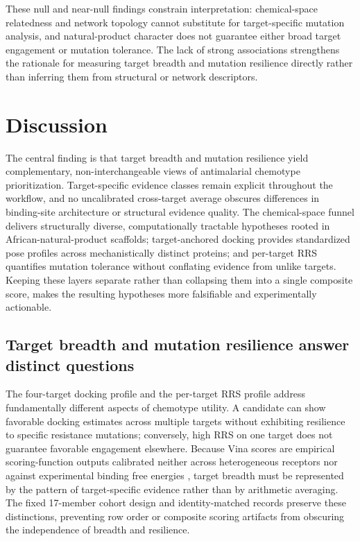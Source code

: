 \documentclass[journal=jcisd8,manuscript=article]{achemso}
\begin{document}
These null and near-null findings constrain interpretation: chemical-space relatedness and network topology cannot substitute for target-specific mutation analysis, and natural-product character does not guarantee either broad target engagement or mutation tolerance. The lack of strong associations strengthens the rationale for measuring target breadth and mutation resilience directly rather than inferring them from structural or network descriptors.

\section{Discussion}
The central finding is that target breadth and mutation resilience yield complementary, non-interchangeable views of antimalarial chemotype prioritization. Target-specific evidence classes remain explicit throughout the workflow, and no uncalibrated cross-target average obscures differences in binding-site architecture or structural evidence quality. The chemical-space funnel delivers structurally diverse, computationally tractable hypotheses rooted in African-natural-product scaffolds; target-anchored docking provides standardized pose profiles across mechanistically distinct proteins; and per-target RRS quantifies mutation tolerance without conflating evidence from unlike targets. Keeping these layers separate rather than collapsing them into a single composite score, makes the resulting hypotheses more falsifiable and experimentally actionable.

\subsection{Target breadth and mutation resilience answer distinct questions}
The four-target docking profile and the per-target RRS profile address fundamentally different aspects of chemotype utility. A candidate can show favorable docking estimates across multiple targets without exhibiting resilience to specific resistance mutations; conversely, high RRS on one target does not guarantee favorable engagement elsewhere. Because Vina scores are empirical scoring-function outputs calibrated neither across heterogeneous receptors nor against experimental binding free energies \cite{Quiroga2016}, target breadth must be represented by the pattern of target-specific evidence rather than by arithmetic averaging. The fixed 17-member cohort design and identity-matched records preserve these distinctions, preventing row order or composite scoring artifacts from obscuring the independence of breadth and resilience.
\end{document}
